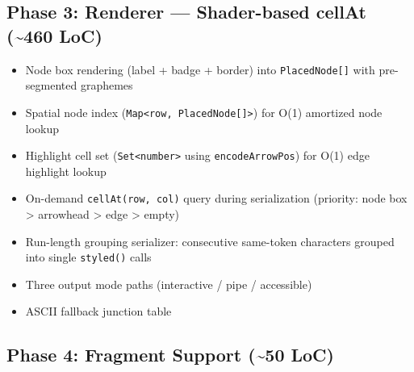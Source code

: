 

\subsection{Phase 3: Renderer --- Shader-based cellAt (\textasciitilde460 LoC)}\label{record-426-phase-3-renderer-shader-based-cellat-460-loc}

\begin{itemize}
\tightlist
\item
  Node box rendering (label + badge + border) into \texttt{P\allowbreak{}l\allowbreak{}a\allowbreak{}c\allowbreak{}e\allowbreak{}d\allowbreak{}N\allowbreak{}o\allowbreak{}d\allowbreak{}e\allowbreak{}[\allowbreak{}]} with pre-segmented graphemes
\item
  Spatial node index (\texttt{M\allowbreak{}a\allowbreak{}p\allowbreak{}<\allowbreak{}r\allowbreak{}o\allowbreak{}w\allowbreak{},\allowbreak{} \allowbreak{}P\allowbreak{}l\allowbreak{}a\allowbreak{}c\allowbreak{}e\allowbreak{}d\allowbreak{}N\allowbreak{}o\allowbreak{}d\allowbreak{}e\allowbreak{}[\allowbreak{}]\allowbreak{}>}) for O(1) amortized node lookup
\item
  Highlight cell set (\texttt{S\allowbreak{}e\allowbreak{}t\allowbreak{}<\allowbreak{}n\allowbreak{}u\allowbreak{}m\allowbreak{}b\allowbreak{}e\allowbreak{}r\allowbreak{}>} using \texttt{e\allowbreak{}n\allowbreak{}c\allowbreak{}o\allowbreak{}d\allowbreak{}e\allowbreak{}A\allowbreak{}r\allowbreak{}r\allowbreak{}o\allowbreak{}w\allowbreak{}P\allowbreak{}o\allowbreak{}s}) for O(1) edge highlight lookup
\item
  On-demand \texttt{c\allowbreak{}e\allowbreak{}l\allowbreak{}l\allowbreak{}A\allowbreak{}t\allowbreak{}(\allowbreak{}r\allowbreak{}o\allowbreak{}w\allowbreak{},\allowbreak{} \allowbreak{}c\allowbreak{}o\allowbreak{}l\allowbreak{})} query during serialization (priority: node box \textgreater{} arrowhead \textgreater{} edge \textgreater{} empty)
\item
  Run-length grouping serializer: consecutive same-token characters grouped into single \texttt{s\allowbreak{}t\allowbreak{}y\allowbreak{}l\allowbreak{}e\allowbreak{}d\allowbreak{}(\allowbreak{})} calls
\item
  Three output mode paths (interactive / pipe / accessible)
\item
  ASCII fallback junction table
\end{itemize}

\subsection{Phase 4: Fragment Support (\textasciitilde50 LoC)}\label{record-426-phase-4-fragment-support-50-loc}

